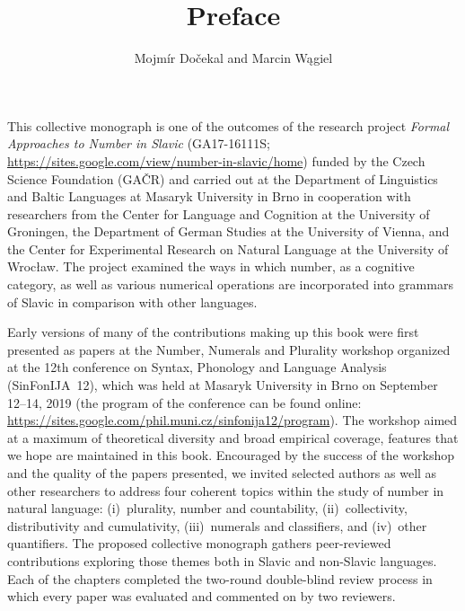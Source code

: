 \documentclass[output=paper]{langscibook}
\author{Mojmír Dočekal\affiliation{Masaryk University} and Marcin Wągiel\affiliation{Masaryk University}}
\title{Preface}
\begin{document}
\maketitle

\noindent This collective monograph is one of the outcomes of the research project \textit{Formal Approaches to Number in Slavic} (GA17-16111S; \url{https://sites.google.com/view/number-in-slavic/home}) funded by the Czech Science Foundation (GAČR) and carried out at the Department of Linguistics and Baltic Languages at Masaryk University in Brno in cooperation with researchers from the Center for Language and Cognition at the University of Groningen, the Department of German Studies at the University of Vienna, and the Center for Experimental Research on Natural Language at the University of Wrocław. The project examined the ways in which number, as a cognitive category, as well as various numerical operations are incorporated into grammars of Slavic in comparison with other languages.

Early versions of many of the contributions making up this book were first presented as papers at the Number, Numerals and Plurality workshop organized at the 12th conference on Syntax, Phonology and Language Analysis (SinFonIJA~12), which was held at Masaryk University in Brno on September 12--14, 2019 (the program of the conference can be found online: \url{https://sites.google.com/phil.muni.cz/sinfonija12/program}). The workshop aimed at a maximum of theoretical diversity and broad empirical coverage, features that we hope are maintained in this book. Encouraged by the success of the workshop and the quality of the papers presented, we invited selected authors as well as other researchers to address four coherent topics within the study of number in natural language: (i)~plurality, number and countability, (ii)~collectivity, distributivity and cumulativity, (iii)~numerals and classifiers, and (iv)~other quantifiers. The proposed collective monograph gathers peer-reviewed contributions exploring those themes both in Slavic and non-Slavic languages. Each of the chapters completed the two-round double-blind review process in which every paper was evaluated and commented on by two reviewers.
\end{document}
